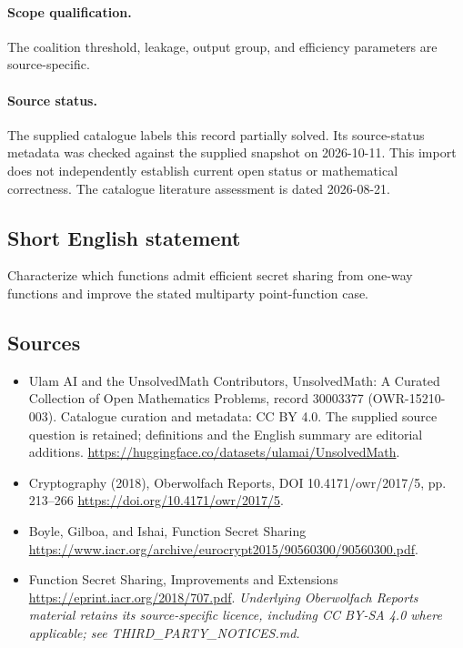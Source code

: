 \documentclass[11pt]{article}
\begin{document}
\paragraph{Scope qualification.}
The coalition threshold, leakage, output group, and efficiency parameters are source-specific.
\paragraph{Source status.}
The supplied catalogue labels this record partially solved. Its source-status metadata was checked against the supplied snapshot on 2026-10-11. This import does not independently establish current open status or mathematical correctness. The catalogue literature assessment is dated 2026-08-21.
\subsection{Short English statement}
Characterize which functions admit efficient secret sharing from one-way functions and improve the stated multiparty point-function case.
\subsection{Sources}
\begin{itemize}
\item[S1] Ulam AI and the UnsolvedMath Contributors, UnsolvedMath: A Curated Collection of Open Mathematics Problems, record 30003377 (OWR-15210-003). Catalogue curation and metadata: CC BY 4.0. The supplied source question is retained; definitions and the English summary are editorial additions.
\url{https://huggingface.co/datasets/ulamai/UnsolvedMath}.
\item[S2] Cryptography (2018), Oberwolfach Reports, DOI 10.4171/owr/2017/5, pp. 213--266
\url{https://doi.org/10.4171/owr/2017/5}.
\item[S3] Boyle, Gilboa, and Ishai, Function Secret Sharing
\url{https://www.iacr.org/archive/eurocrypt2015/90560300/90560300.pdf}.
\item[S4] Function Secret Sharing, Improvements and Extensions
\url{https://eprint.iacr.org/2018/707.pdf}.
\textit{Underlying Oberwolfach Reports material retains its source-specific licence, including CC BY-SA 4.0 where applicable; see THIRD\_PARTY\_NOTICES.md.}
\end{itemize}
\end{document}
